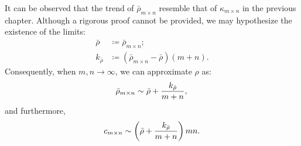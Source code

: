 \documentclass[11pt]{article}
\begin{document}
    It can be observed that the trend of $\bar{\rho}_{m\times n}$ resemble that of $\kappa_{m\times n}$ in the previous chapter.
    Although a rigorous proof cannot be provided, we may hypothesize the existence of the limits:
    \begin{align*}
        \bar{\rho}     & \coloneq \bar{\rho}_{m\times n}; \\
        k_{\bar{\rho}} & \coloneq (\bar{\rho}_{m\times n}-\bar{\rho})(m+n).
    \end{align*}
    Consequently, when $m,n\rightarrow\infty$, we can approximate $\rho$ as:
    \[
        \bar{\rho}_{m\times n} \sim \bar{\rho}+\frac{k_{\bar{\rho}}}{m+n}, \\
    \]
    and furthermore,
    \[
        c_{m\times n} \sim \left(\bar{\rho}+\frac{k_{\bar{\rho}}}{m+n}\right)mn. \\
    \]
\end{document}
